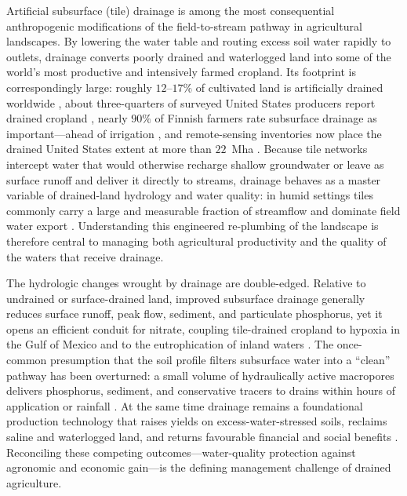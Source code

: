 Artificial subsurface (tile) drainage is among the most consequential
anthropogenic modifications of the field-to-stream pathway in agricultural
landscapes. By lowering the water table and routing excess soil water rapidly
to outlets, drainage converts poorly drained and waterlogged land into some of
the world's most productive and intensively farmed cropland. Its footprint is
correspondingly large: roughly $12$--$17\%$ of cultivated land is artificially
drained worldwide \parencite{Valipour2014}, about three-quarters of surveyed
United States producers report drained cropland \parencite{Morton2015}, nearly
$90\%$ of Finnish farmers rate subsurface drainage as important---ahead of
irrigation \parencite{PeltonenSainio2021}, and remote-sensing inventories now
place the drained United States extent at more than $22$~Mha
\parencite{Valayamkunnath2020}. Because tile networks intercept water that would
otherwise recharge shallow groundwater or leave as surface runoff and deliver it
directly to streams, drainage behaves as a master variable of drained-land
hydrology and water quality: in humid settings tiles commonly carry a large and
measurable fraction of streamflow and dominate field water export
\parencite{King2014,Williams2018,Schilling2019}. Understanding this engineered
re-plumbing of the landscape is therefore central to managing both agricultural
productivity and the quality of the waters that receive drainage.

The hydrologic changes wrought by drainage are double-edged. Relative to
undrained or surface-drained land, improved subsurface drainage generally
reduces surface runoff, peak flow, sediment, and particulate phosphorus, yet it
opens an efficient conduit for nitrate, coupling tile-drained cropland to
hypoxia in the Gulf of Mexico and to the eutrophication of inland waters
\parencite{FAUSEY1995,SKAGGS1994,THOMAS1995,Gramlich2018,Raymond2012}. The
once-common presumption that the soil profile filters subsurface water into a
``clean'' pathway has been overturned: a small volume of hydraulically active
macropores delivers phosphorus, sediment, and conservative tracers to drains
within hours of application or rainfall \parencite{Pease2018}. At the
same time drainage remains a foundational production technology that raises
yields on excess-water-stressed soils, reclaims saline and waterlogged land, and
returns favourable financial and social benefits \parencite{Singh2022b,Yang2025}.
Reconciling these competing outcomes---water-quality protection against
agronomic and economic gain---is the defining management challenge of drained
agriculture.

